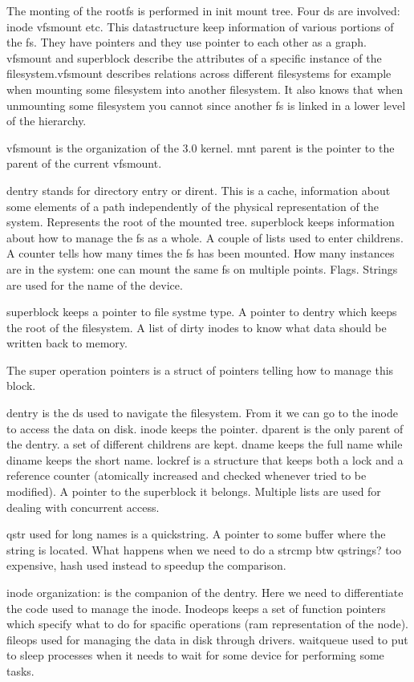 \documentclass[twoside]{article}
\begin{document}
The monting of the rootfs is performed in init mount tree. Four ds are involved:
inode vfsmount etc. This datastructure keep information of various portions of
the fs. They have pointers and they use pointer to each other as a graph.
vfsmount and superblock describe the attributes of a specific instance of the
filesystem.vfsmount describes relations across different filesystems for example
when mounting some filesystem into another filesystem. It also knows that when
unmounting some filesystem you cannot since another fs is linked in a lower
level of the hierarchy.

vfsmount is the organization of the 3.0 kernel. mnt parent is the pointer to the
parent of the current vfsmount.

dentry stands for directory entry or dirent. This is a cache, information about
some elements of a path independently of the physical representation of the
system. Represents the root of the mounted tree. superblock keeps information
about how to manage the fs as a whole. A couple of lists used to enter
childrens. A counter tells how many times the fs has been mounted. How many
instances are in the system: one can mount the same fs on multiple points.
Flags. Strings are used for the name of the device.

superblock keeps a pointer to file systme type. A pointer to dentry which keeps
the root of the filesystem. A list of dirty inodes to know what data should be
written back to memory. 

The super operation pointers is a struct of pointers telling how to manage this
block.

dentry is the ds used to navigate the filesystem. From it we can go to the inode
to access the data on disk. inode keeps the pointer. dparent is the only parent
of the dentry. a set of different childrens are kept. dname keeps the full name
while diname keeps the short name. lockref is a structure that keeps both a lock
and a reference counter (atomically increased and checked whenever tried to be
modified). A pointer to the superblock it belongs. Multiple lists are used for
dealing with concurrent access.

qstr used for long names is a quickstring. A pointer to some buffer where the
string is located. What happens when we need to do a strcmp btw qstrings? too
expensive, hash used instead to speedup the comparison.

inode organization: is the companion of the dentry. Here we need to
differentiate the code used to manage the inode. Inodeops keeps a set of
function pointers which specify what to do for spacific operations (ram
representation of the node). fileops used for managing the data in disk through
drivers. waitqueue used to put to sleep processes when it needs to wait for some
device for performing some tasks.
\end{document}
